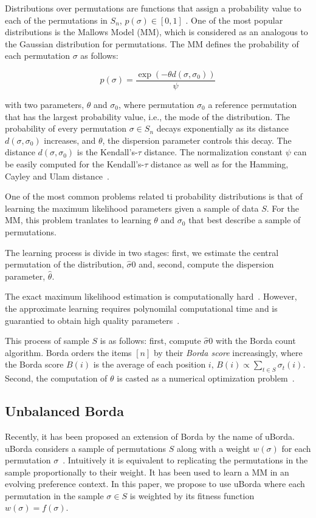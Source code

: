 \documentclass[runningheads]{llncs}
\begin{document}
Distributions over permutations are functions that assign a probability value to each of the permutations in $S_n$, $p(\sigma)\in[0,1]$ \cite{critchlow91}. One of the most popular distributions is the Mallows Model (MM), which is considered as an analogous to the Gaussian distribution for permutations. The MM defines the probability of each permutation $\sigma$ as follows:

\begin{equation}
p(\sigma)=\frac{\exp(-\theta d(\sigma, \sigma_0))}{\psi}
\end{equation}

with two parameters, $\theta$ and $\sigma_0$, 
where permutation $\sigma_0$ a reference permutation that has the largest probability value, i.e., the mode of the distribution. The probability of every permutation $\sigma\in S_n$ decays exponentially as its distance $d(\sigma,\sigma_0)$ increases, and $\theta$, the dispersion parameter controls this decay. The distance $d(\sigma,\sigma_0)$ is the Kendall's-$\tau$ distance. The normalization constant $\psi$ can be easily computed for the Kendall's-$\tau$ distance as well as for the Hamming, Cayley and Ulam distance~\cite{Irurozki2016b}. 

One of the most common problems related ti probability distributions is that of learning the maximum likelihood parameters  given a sample of data $S$. For the MM, this problem tranlates to learning $\theta$ and $\sigma_0$ that best describe a sample of permutations. 

The learning process is divide in two stages: first, we estimate the central permutation of the distribution, $\hat\sigma0$ and, second, compute the dispersion parameter, $\hat\theta$. 

The exact maximum likelihood estimation is computationally hard~\cite{Dwork:2001:RAM:371920.372165}. However, the approximate learning requires polynomilal computational time and is guarantied to obtain high quality parameters~\cite{Caragiannis2013,Coppersmith:2010}. 

This process of sample $S$ is as follows: first, compute $\hat\sigma0$ with the Borda count algorithm. Borda orders the items $[n]$ by their \textit{Borda score} increasingly, where the Borda score $B(i)$ is the average of each position $i$, $B(i) \propto \sum_{t\in S}  \sigma_t(i)$. Second, the computation of $\theta$ is casted as a numerical optimization problem~\cite{Irurozki2016b}. 

\subsection{Unbalanced Borda}\label{sec:uborda}
Recently, it has been proposed an extension of Borda by the name of uBorda. uBorda considers a sample of permutations $S$ along with a weight $w(\sigma)$ for each permutation $\sigma$~\cite{}. Intuitively it is equivalent to replicating the permutations in the sample proportionally to their weight. It has been used to learn a MM in an evolving preference context. In this paper, we propose to use uBorda where each permutation in the sample $\sigma\in S$ is weighted by its fitness function $w(\sigma)=f(\sigma)$.
\end{document}
